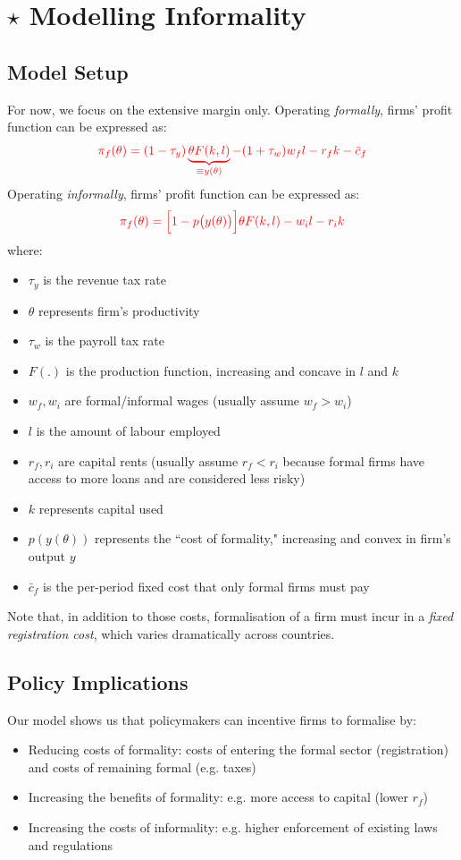 \section{$\star$ Modelling Informality}
    \subsection{Model Setup}
        For now, we focus on the extensive margin only.
        Operating \emph{formally}, firms' profit function can be expressed as:
        $$\color{red} \pi_f(\theta) = (1-\tau_y)\underbrace{\theta F(k,l)}_{\equiv y(\theta)} - (1+\tau_w)w_fl -r_f k - \bar{c}_f$$
        Operating \emph{informally}, firms' profit function can be expressed as:
        $$\color{red} \pi_f(\theta) = \Big[1-p\big(y(\theta)\big)\Big]\theta F(k,l) - w_il -r_ik$$
        where:
        \begin{itemize}
            \item $\tau_y$ is the revenue tax rate
            \item $\theta$ represents firm's productivity
            \item $\tau_w$ is the payroll tax rate
            \item $F(.)$ is the production function, increasing and concave in $l$ and $k$
            \item $w_f, w_i$ are formal/informal wages (usually assume $w_f>w_i$)
            \item $l$ is the amount of labour employed
            \item $r_f, r_i$ are capital rents (usually assume $r_f<r_i$ because formal firms have access to more loans and are considered less risky)
            \item $k$ represents capital used
            \item $p(y(\theta))$ represents the ``cost of formality," increasing and convex in firm's output $y$
            \item $\bar{c}_f$ is the per-period fixed cost that only formal firms must pay
        \end{itemize}
        Note that, in addition to those costs, formalisation of a firm must incur in a \emph{fixed registration cost}, which varies dramatically across countries.
    
    \subsection{Policy Implications}
        Our model shows us that policymakers can incentive firms to formalise by:
        \begin{itemize}
            \item Reducing costs of formality: costs of entering the formal sector (registration) and costs of remaining formal (e.g. taxes)
            \item Increasing the benefits of formality: e.g. more access to capital (lower $r_f$)
            \item Increasing the costs of informality: e.g. higher enforcement of existing laws and regulations
        \end{itemize}
        
